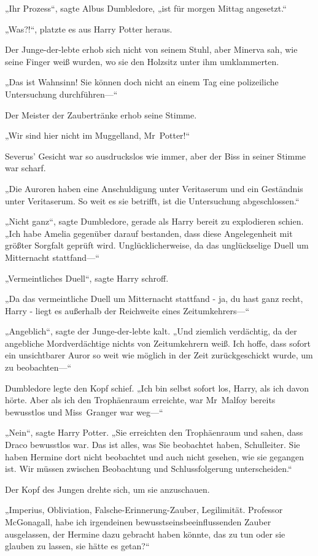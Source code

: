 {„Ihr Prozess“, sagte Albus Dumbledore, „ist für morgen Mittag angesetzt.“

„Was?!“, platzte es aus Harry Potter heraus.

Der Junge-der-lebte erhob sich nicht von seinem Stuhl, aber Minerva sah, wie seine Finger weiß wurden, wo sie den Holzsitz unter ihm umklammerten.

„Das ist Wahnsinn! Sie können doch nicht an einem Tag eine polizeiliche Untersuchung durchführen—“

Der Meister der Zaubertränke erhob seine Stimme.

„Wir sind hier nicht im Muggelland, Mr~Potter!“

Severus' Gesicht war so ausdruckslos wie immer, aber der Biss in seiner Stimme war scharf.

„Die Auroren haben eine Anschuldigung unter Veritaserum und ein Geständnis unter Veritaserum. So weit es sie betrifft, ist die Untersuchung abgeschlossen.“

„Nicht ganz“, sagte Dumbledore, gerade als Harry bereit zu explodieren schien. „Ich habe Amelia gegenüber darauf bestanden, dass diese Angelegenheit mit größter Sorgfalt geprüft wird. Unglücklicherweise, da das unglückselige Duell um Mitternacht stattfand—“

„Vermeintliches Duell“, sagte Harry schroff.

„Da das vermeintliche Duell um Mitternacht stattfand - ja, du hast ganz recht, Harry - liegt es außerhalb der Reichweite eines Zeitumkehrers—“

„Angeblich“, sagte der Junge-der-lebte kalt. „Und ziemlich verdächtig, da der angebliche Mordverdächtige nichts von Zeitumkehrern weiß. Ich hoffe, dass sofort ein unsichtbarer Auror so weit wie möglich in der Zeit zurückgeschickt wurde, um zu beobachten—“

Dumbledore legte den Kopf schief. „Ich bin selbst sofort los, Harry, als ich davon hörte. Aber als ich den Trophäenraum erreichte, war Mr~Malfoy bereits bewusstlos und Miss~Granger war weg—“

„Nein“, sagte Harry Potter. „Sie erreichten den Trophäenraum und sahen, dass Draco bewusstlos war. Das ist alles, was Sie beobachtet haben, Schulleiter. Sie haben Hermine dort nicht beobachtet und auch nicht gesehen, wie sie gegangen ist. Wir müssen zwischen Beobachtung und Schlussfolgerung unterscheiden.“

Der Kopf des Jungen drehte sich, um sie anzuschauen.

„Imperius, Obliviation, Falsche-Erinnerung-Zauber, Legilimität. Professor McGonagall, habe ich irgendeinen bewusstseinsbeeinflussenden Zauber ausgelassen, der Hermine dazu gebracht haben könnte, das zu tun oder sie glauben zu lassen, sie hätte es getan?“

}
